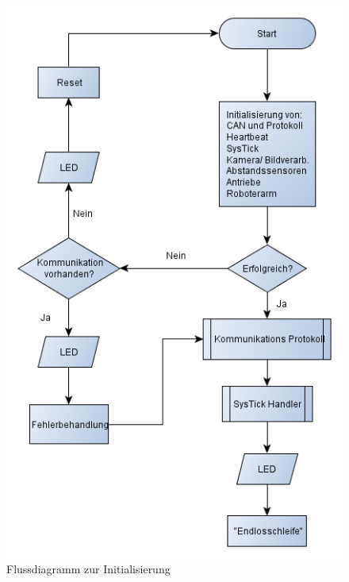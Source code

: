 \begin{figure}[H]
\centering
  \begin{minipage}[b]{0.49\linewidth}
    \includegraphics[width=\linewidth]{Bilder/FaTNet_init} 
    \caption{Flussdiagramm zur Initialisierung }
    \label{fig:init}
  \end{minipage}
  \begin{minipage}[b]{0.49\linewidth}

\end{minipage}
\end{figure}
